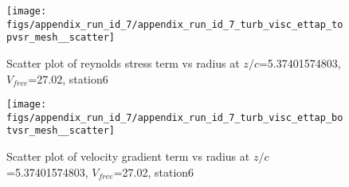 \begin{figure}[H]
\centering
\texttt{[image: figs/appendix\_run\_id\_7/appendix\_run\_id\_7\_turb\_visc\_ettap\_topvsr\_mesh\_\_scatter]}
\caption{Scatter plot of reynolds stress term vs radius at $z/c$=5.37401574803, $V_{free}$=27.02, station6}
\label{fig:appendix_run_id_7_turb_visc_ettap_topvsr_mesh__scatter}
\end{figure}


\begin{figure}[H]
\centering
\texttt{[image: figs/appendix\_run\_id\_7/appendix\_run\_id\_7\_turb\_visc\_ettap\_botvsr\_mesh\_\_scatter]}
\caption{Scatter plot of velocity gradient term vs radius at $z/c$=5.37401574803, $V_{free}$=27.02, station6}
\label{fig:appendix_run_id_7_turb_visc_ettap_botvsr_mesh__scatter}
\end{figure}


